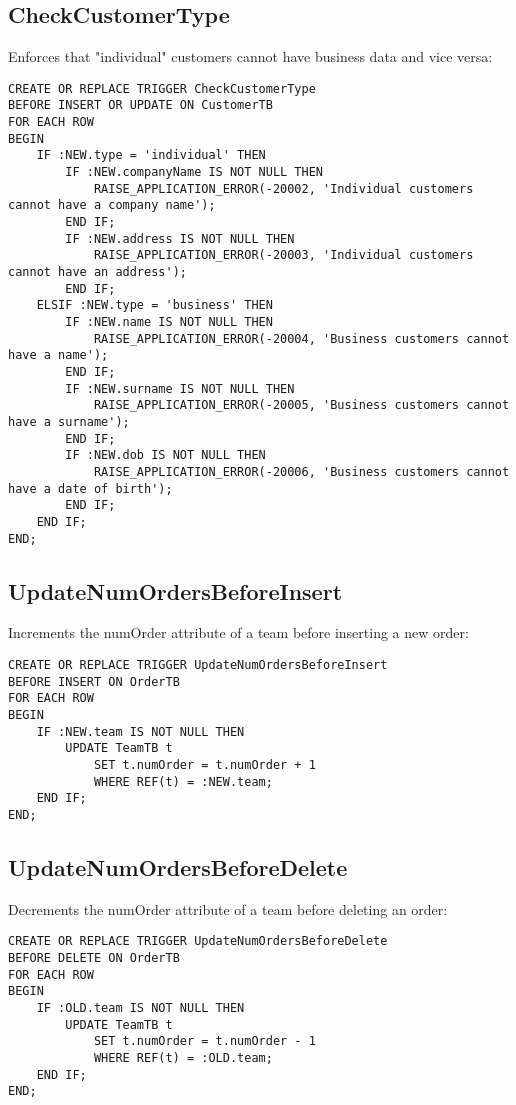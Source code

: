 \subsection*{CheckCustomerType}
Enforces that "individual" customers cannot have business data and vice versa:
\begin{lstlisting}
CREATE OR REPLACE TRIGGER CheckCustomerType
BEFORE INSERT OR UPDATE ON CustomerTB
FOR EACH ROW
BEGIN
    IF :NEW.type = 'individual' THEN
        IF :NEW.companyName IS NOT NULL THEN
            RAISE_APPLICATION_ERROR(-20002, 'Individual customers cannot have a company name');
        END IF;
        IF :NEW.address IS NOT NULL THEN
            RAISE_APPLICATION_ERROR(-20003, 'Individual customers cannot have an address');
        END IF;
    ELSIF :NEW.type = 'business' THEN
        IF :NEW.name IS NOT NULL THEN
            RAISE_APPLICATION_ERROR(-20004, 'Business customers cannot have a name');
        END IF;
        IF :NEW.surname IS NOT NULL THEN
            RAISE_APPLICATION_ERROR(-20005, 'Business customers cannot have a surname');
        END IF;
        IF :NEW.dob IS NOT NULL THEN
            RAISE_APPLICATION_ERROR(-20006, 'Business customers cannot have a date of birth');
        END IF;
    END IF;
END;
\end{lstlisting}

\subsection*{UpdateNumOrdersBeforeInsert}
Increments the numOrder attribute of a team before inserting a new order:
\begin{lstlisting}
CREATE OR REPLACE TRIGGER UpdateNumOrdersBeforeInsert
BEFORE INSERT ON OrderTB
FOR EACH ROW
BEGIN
    IF :NEW.team IS NOT NULL THEN
        UPDATE TeamTB t
            SET t.numOrder = t.numOrder + 1
            WHERE REF(t) = :NEW.team;
    END IF;
END;
\end{lstlisting} 

\subsection*{UpdateNumOrdersBeforeDelete}
Decrements the numOrder attribute of a team before deleting an order:
\begin{lstlisting}
CREATE OR REPLACE TRIGGER UpdateNumOrdersBeforeDelete
BEFORE DELETE ON OrderTB
FOR EACH ROW
BEGIN
    IF :OLD.team IS NOT NULL THEN
        UPDATE TeamTB t
            SET t.numOrder = t.numOrder - 1
            WHERE REF(t) = :OLD.team;
    END IF;
END; 
\end{lstlisting}

